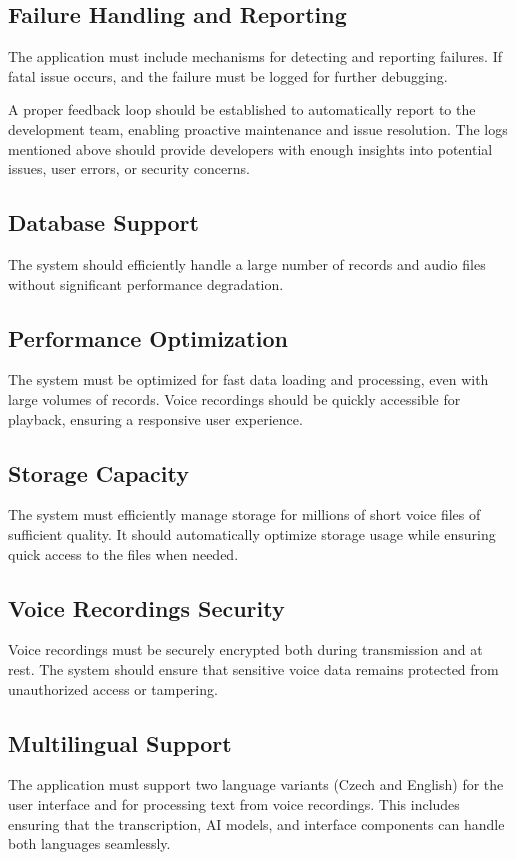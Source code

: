 \documentclass[
  digital,     %
  oneside,     %
  nosansbold,  %
  nocolorbold, %
  lof,         %
  lot,         %
]{fithesis4}
\begin{document}
\subsection{Failure Handling and Reporting}  
The application must include mechanisms for detecting and reporting failures. If fatal issue occurs, and the failure must be logged for further debugging.  

A proper feedback loop should be established to automatically report to the development team, enabling proactive maintenance and issue resolution. The logs mentioned above should provide developers with enough insights into potential issues, user errors, or security concerns.

\subsection{Database Support}  
The system should efficiently handle a large number of records and audio files without significant performance degradation.  

\subsection{Performance Optimization}  
The system must be optimized for fast data loading and processing, even with large volumes of records. Voice recordings should be quickly accessible for playback, ensuring a responsive user experience.

\subsection{Storage Capacity}  
The system must efficiently manage storage for millions of short voice files of sufficient quality. It should automatically optimize storage usage while ensuring quick access to the files when needed.

\subsection{Voice Recordings Security}  
Voice recordings must be securely encrypted both during transmission and at rest. The system should ensure that sensitive voice data remains protected from unauthorized access or tampering.

\subsection{Multilingual Support}  
The application must support two language variants (Czech and English) for the user interface and for processing text from voice recordings. This includes ensuring that the transcription, \gls{AI} models, and interface components can handle both languages seamlessly.
\end{document}
